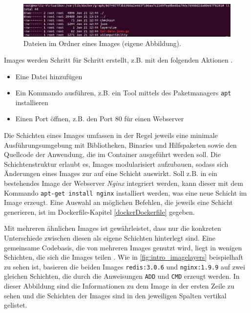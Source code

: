 \documentclass[../main.tex]{subfiles}
\begin{document}
			\begin{figure}[!htbp]
          \centering
          \includegraphics[width=1.0\textwidth]{./images/intro_dockerImageVZ.jpg}
          \caption{Dateien im Ordner eines Images (eigene Abbildung).}
          \label{fig:intro_dockerImageVZ}
      \end{figure}

			Images werden Schritt für Schritt erstellt, z.B. mit den folgenden Aktionen \cite[S.11]{dockerBook}.
			\begin{itemize}
				\item Eine Datei hinzufügen
				\item Ein Kommando ausführen, z.B. ein Tool mittels des Paketmanagers \texttt{apt} installieren
				\item Einen Port öffnen, z.B. den Port 80 für einen Webserver
			\end{itemize}

      Die Schichten eines Images umfassen in der Regel jeweils eine minimale Ausführungsumgebung mit Bibliotheken, Binaries und Hilfspaketen sowie den Quellcode der Anwendung, die im Container ausgeführt werden soll. Die Schichtenstruktur erlaubt es, Images modularisiert aufzubauen, sodass sich Änderungen eines Images zur auf eine Schicht auswirkt. Soll z.B. in ein bestehendes Image der Webserver \emph{Nginx} integriert werden, kann dieser mit dem Kommando \texttt{apt-get install nginx} installiert werden, was eine neue Schicht im Image erzeugt. Eine Auswahl an möglichen Befehlen, die jeweils eine Schicht generieren, ist im Dockerfile-Kapitel \ref{dockerDockerfile} gegeben.

			Mit mehreren ähnlichen Images ist gewährleistet, dass nur die konkreten Unterschiede zwischen diesen als eigene Schichten hinterlegt sind. Eine gemeinsame Codebasis, die von mehreren Images genutzt wird, liegt in wenigen Schichten, die sich die Images teilen \cite[S.3]{dockerIntroIEEE}. Wie in \fig \ref{fig:intro_imagelayers} beispielhaft zu sehen ist, basieren die beiden Images \texttt{redis:3.0.6} und \texttt{nginx:1.9.9} auf zwei gleichen Schichten, die durch die Anweisungen \texttt{ADD} und \texttt{CMD} erzeugt werden. In dieser Abbildung sind die Informationen zu dem Image in der ersten Zeile zu sehen und die Schichten der Images sind in den jeweiligen Spalten vertikal gelistet.
\end{document}
